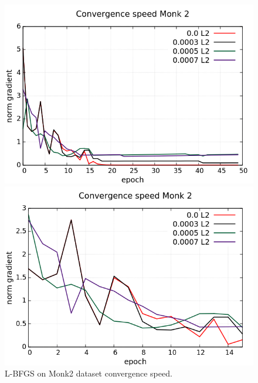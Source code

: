 \begin{figure}[H]
	\centering
	\begin{minipage}[t]{0.5\linewidth}
		\includegraphics[width=\linewidth]{data/LBFGS/Monk2/Monk2_LBFGS_L2_CS_standard.png}
	\end{minipage}%
	\begin{minipage}[t]{0.5\linewidth}
		\includegraphics[width=\linewidth]{data/LBFGS/Monk2/Monk2_LBFGS_L2_CS_zoom.png}
	\end{minipage}
	\caption{L-BFGS on Monk2 dataset convergence speed.}
\end{figure}
